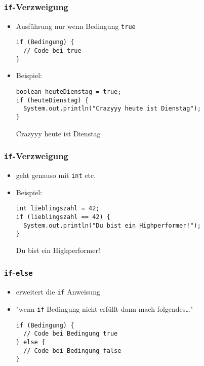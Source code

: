 \documentclass{../../presentation}
\begin{document}
\begin{frame}[fragile]
  \frametitle{\texttt{if}-Verzweigung}

  \begin{itemize}
    \item<1-> Ausführung nur wenn Bedingung \texttt{true}
          \begin{verbatim}
if (Bedingung) {
  // Code bei true
}
      \end{verbatim}
    \item<2-> Beispiel:
          \begin{verbatim}
boolean heuteDienstag = true;
if (heuteDienstag) {
  System.out.println("Crazyyy heute ist Dienstag");
}
      \end{verbatim}
          \begin{ausgabe}
            Crazyyy heute ist Dienstag
          \end{ausgabe}
  \end{itemize}
\end{frame}

\begin{frame}[fragile]
  \frametitle{\texttt{if}-Verzweigung}

  \begin{itemize}
    \item<1-> geht genauso mit \texttt{int} etc.
    \item<2-> Beispiel:
          \begin{verbatim}
int lieblingszahl = 42;
if (lieblingszahl == 42) {
  System.out.println("Du bist ein Highperformer!");
}
      \end{verbatim}
          \begin{ausgabe}
            Du bist ein Highperformer!
          \end{ausgabe}
  \end{itemize}
\end{frame}



\begin{frame}[fragile]
  \frametitle{\texttt{if}-\texttt{else}}

  \begin{itemize}
    \item<1-> erweitert die \texttt{if} Anweisung
    \item<1-> "wenn \texttt{if} Bedingung nicht erfüllt dann mach folgendes\dots"
          \begin{verbatim}
if (Bedingung) {
  // Code bei Bedingung true
} else {
  // Code bei Bedingung false
}
\end{verbatim}
  \end{itemize}
\end{frame}
\end{document}
